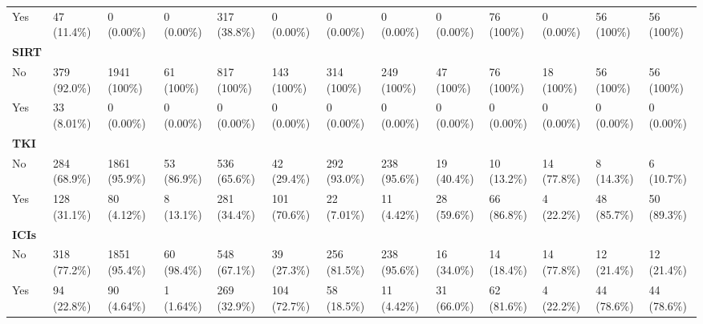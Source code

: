 \documentclass{article}
\begin{document}
\begin{landscape}
\begin{tiny}
\begin{tabularx}{\linewidth}{p{4.5cm}|X|X|X|X|X|X|X|X|X|X|X|X}
\rowcolor{gray!10}
    Yes &    47 (11.4\%)    &    0 (0.00\%)     &    0 (0.00\%)     &   317 (38.8\%)    &    0 (0.00\%)     &    0 (0.00\%)     &    0 (0.00\%)     &    0 (0.00\%)     &    76 (100\%)     &    0 (0.00\%)     &    56 (100\%)     &    56 (100\%)     \\
\rowcolor{gray!30}
\textbf{SIRT }  &  &  &  &  &  &  &  &  &  &  &  &  \\
\rowcolor{gray!10}
    No &   379 (92.0\%)    &   1941 (100\%)    &    61 (100\%)     &    817 (100\%)    &    143 (100\%)    &    314 (100\%)    &    249 (100\%)    &    47 (100\%)     &    76 (100\%)     &    18 (100\%)     &    56 (100\%)     &    56 (100\%)     \\
\rowcolor{gray!10}
    Yes &    33 (8.01\%)    &    0 (0.00\%)     &    0 (0.00\%)     &    0 (0.00\%)     &    0 (0.00\%)     &    0 (0.00\%)     &    0 (0.00\%)     &    0 (0.00\%)     &    0 (0.00\%)     &    0 (0.00\%)     &    0 (0.00\%)     &    0 (0.00\%)     \\
\rowcolor{gray!30}
\textbf{TKI }  &  &  &  &  &  &  &  &  &  &  &  &  \\
\rowcolor{gray!10}
    No &   284 (68.9\%)    &   1861 (95.9\%)   &    53 (86.9\%)    &   536 (65.6\%)    &    42 (29.4\%)    &   292 (93.0\%)    &   238 (95.6\%)    &    19 (40.4\%)    &    10 (13.2\%)    &    14 (77.8\%)    &    8 (14.3\%)     &    6 (10.7\%)     \\
\rowcolor{gray!10}
    Yes &   128 (31.1\%)    &    80 (4.12\%)    &    8 (13.1\%)     &   281 (34.4\%)    &   101 (70.6\%)    &    22 (7.01\%)    &    11 (4.42\%)    &    28 (59.6\%)    &    66 (86.8\%)    &    4 (22.2\%)     &    48 (85.7\%)    &    50 (89.3\%)    \\
\rowcolor{gray!30}
\textbf{ICIs }  &  &  &  &  &  &  &  &  &  &  &  &  \\
\rowcolor{gray!10}
    No &   318 (77.2\%)    &   1851 (95.4\%)   &    60 (98.4\%)    &   548 (67.1\%)    &    39 (27.3\%)    &   256 (81.5\%)    &   238 (95.6\%)    &    16 (34.0\%)    &    14 (18.4\%)    &    14 (77.8\%)    &    12 (21.4\%)    &    12 (21.4\%)    \\
\rowcolor{gray!10}
    Yes &    94 (22.8\%)    &    90 (4.64\%)    &    1 (1.64\%)     &   269 (32.9\%)    &   104 (72.7\%)    &    58 (18.5\%)    &    11 (4.42\%)    &    31 (66.0\%)    &    62 (81.6\%)    &    4 (22.2\%)     &    44 (78.6\%)    &    44 (78.6\%)    \\
\end{tabularx}
\end{tiny}
\end{landscape}
\end{document}
